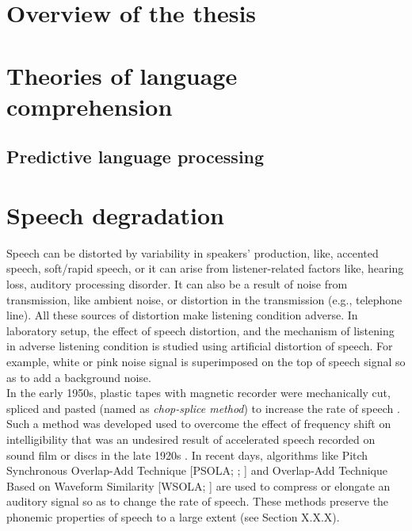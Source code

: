 \documentclass[a4paper, nobind]{templates/ociamthesis}
\begin{document}
\minitoc 

\hypertarget{overview-of-the-thesis}{%
\section{Overview of the thesis}\label{overview-of-the-thesis}}

\hypertarget{theories-of-language-comprehension}{%
\section{Theories of language comprehension}\label{theories-of-language-comprehension}}

\hypertarget{predictive-language-processing}{%
\subsection{Predictive language processing}\label{predictive-language-processing}}

\hypertarget{speech-degradation}{%
\section{Speech degradation}\label{speech-degradation}}

Speech can be distorted by variability in speakers' production, like, accented speech, soft/rapid speech, or it can arise from listener-related factors like, hearing loss, auditory processing disorder.
It can also be a result of noise from transmission, like ambient noise, or distortion in the transmission (e.g., telephone line).
All these sources of distortion make listening condition adverse.
In laboratory setup, the effect of speech distortion, and the mechanism of listening in adverse listening condition is studied using artificial distortion of speech.
For example, white or pink noise signal is superimposed on the top of speech signal so as to add a background noise.\\

In the early 1950s, plastic tapes with magnetic recorder were mechanically cut, spliced and pasted (named as \emph{chop-splice method}) to increase the rate of speech \autocite{Garvey1953}.
Such a method was developed used to overcome the effect of frequency shift on intelligibility that was an undesired result of accelerated speech recorded on sound film or discs in the late 1920s \autocite{Fletcher1929}.
In recent days, algorithms like Pitch Synchronous Overlap-Add Technique {[}PSOLA; \textcite{Charpentier1986}; \textcite{Moulines1990}{]} and Overlap-Add Technique Based on Waveform Similarity {[}WSOLA; \textcite{Verhelst1993}{]} are used to compress or elongate an auditory signal so as to change the rate of speech.
These methods preserve the phonemic properties of speech to a large extent (see Section X.X.X).
\end{document}

